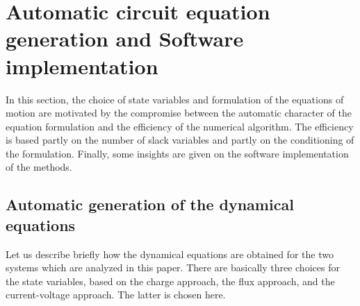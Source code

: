 \section{Automatic circuit equation generation and Software implementation}

In this section, the choice of state variables and formulation of the equations of motion are motivated by the compromise between the automatic character of the equation formulation and the efficiency of the numerical algorithm. The efficiency is based partly on the number of slack variables and partly on the conditioning of the formulation. Finally, some insights are given on the software implementation of the methods.

\subsection{Automatic generation of the dynamical equations}
\label{sec:acef}



Let us describe briefly how the dynamical equations are obtained for the two systems which are analyzed in this paper. There are basically three choices for the state variables, based on the charge approach, the flux approach, and the current-voltage approach. The latter is chosen here.  

